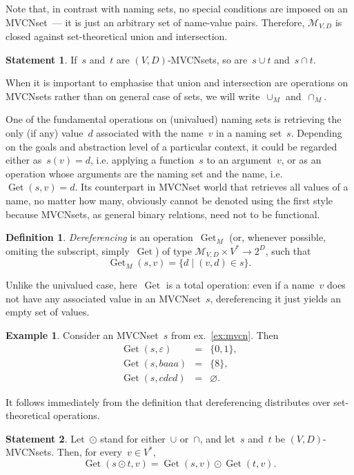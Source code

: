 \documentclass{article}
\theoremstyle{definition}
\newtheorem{Df}{Definition}
\newtheorem{St}{Statement}
\newtheorem{Ex}{Example}
\newcommand{\setcharmvcn}{M}
\newcommand{\setsymbol}[3]{\mathcal{#1}_{#2,#3}}
\newcommand{\setmvcn}[2]{\setsymbol{\setcharmvcn}{#1}{#2}}
\newcommand{\deref}{\operatorname{Get}}
\begin{document}
Note that, in contrast with naming sets, no special conditions are imposed
on an MVCNset~--- it is just an arbitrary set of name-value pairs.
Therefore, $\setmvcn{V}{D}$ is closed against set-theore\-tical union
and intersection.
\begin{St}\label{st:mvcn-setop}
If~$s$ and~$t$ are $(V,D)$-MVCNsets, so are~$s\cup t$ and~$s\cap t$.
\end{St}

When it is important to emphasise that union and intersection are operations
on MVCNsets rather than on general case of sets, we will
write~$\cup_\setcharmvcn$ and~$\cap_\setcharmvcn$.

One of the fundamental operations on (univalued) naming sets is retrieving
the only (if any) value~$d$ associated with the name~$v$ in a naming
set~$s$.  Depending on the goals and abstraction level of a particular
context, it could be regarded either as~$s(v)=d$, i.e. applying a function~$s$
to an argument~$v$, or as an operation whose arguments are the naming set and
the name, i.e.~$\deref(s, v)=d$. Its counterpart in MVCNset world that
retrieves all values of a name, no matter how many, obviously cannot be denoted
using the first style because MVCNsets, as general binary relations, need not
to be functional.

\begin{Df}\label{df:mvcn-dereferencing}
\emph{Dereferencing} is an operation~$\deref_\setcharmvcn$ (or, whenever
possible, omiting the subscript, simply~$\deref$) of type
$\setmvcn{V}{D} \times V^\ast \to 2^D$,
such that
\[
  \deref_\setcharmvcn(s, v) = \{ d \mid (v, d) \in s \} .
\]
\end{Df}

Unlike the univalued case, here~$\deref$ is a total operation: even if a
name~$v$ does not have any associated value in an MVCNset~$s$, dereferencing
it just yields an empty set of values.

\begin{Ex}\label{ex:mvcn-dereferencing}
Consider an MVCNset~$s$ from ex.~\ref{ex:mvcn}. Then
\begin{eqnarray*}
  \deref(s, \varepsilon) & = & \{ 0, 1 \}, \\
  \deref(s, baaa)        & = & \{ 8 \}, \\
  \deref(s, cdcd)        & = & \varnothing .
\end{eqnarray*}

\end{Ex}

It follows immediately from the definition that dereferencing distributes
over set-theore\-tical operations.
\begin{St}\label{st:mvcn-deref-distributivity}
Let~$\odot$ stand for either~$\cup$ or~$\cap$, and let~$s$ and~$t$ be
$(V,D)$-MVCNsets. Then, for every~$v\in V^\ast$,
\[
  \deref(s\odot t, v) = \deref(s, v) \odot \deref(t, v) .
\]
\end{St}
\end{document}
